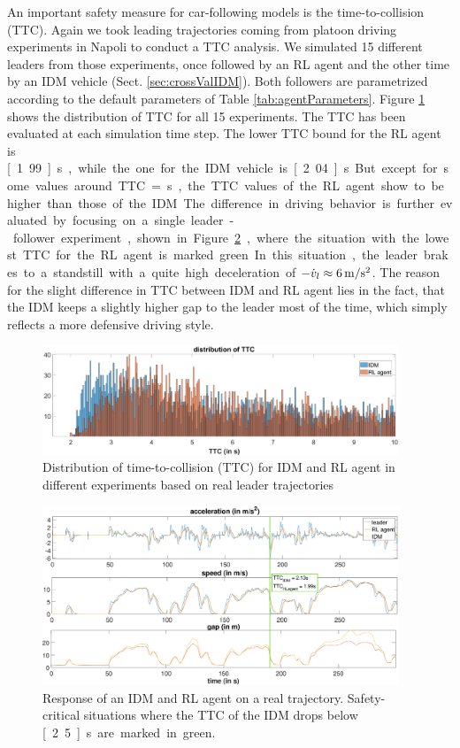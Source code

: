 \documentclass[review]{elsarticle}
\providecommand{\3}{{\ss}}
\begin{document}
	An important safety measure for car-following models is the
	time-to-collision (TTC). Again we took leading trajectories coming
	from platoon driving experiments in Napoli to conduct a TTC
	analysis. We simulated 15 different leaders from those experiments,
	once followed by an RL agent and the other time by an IDM vehicle (Sect. \ref{sec:crossValIDM}). Both
	followers are parametrized according to the default parameters of Table
	\ref{tab:agentParameters}. Figure \ref{fig:DistributionTTC} shows the
	distribution of TTC for all 15 experiments. The TTC has been evaluated
	at each simulation time step. The lower TTC bound for the RL agent is
	\unit[1.99]{s}, while the one for the IDM vehicle is
	\unit[2.04]{s}. But except for some values around TTC = \unit[2]{s}, the TTC values of the RL agent show to be higher than those of the IDM.
	
	The difference in driving behavior is further
	evaluated by focusing on a single leader-follower experiment, shown in
	Figure \ref{fig:TTC_CaseStudy}, where the situation with the lowest TTC for the RL agent is marked green. In this situation, the leader brakes to a standstill with a 
	quite high deceleration of $-\dot{v}_l \approx \unit[6]{m/s^2}$. The reason for the slight
	difference in TTC between IDM and RL agent lies in the fact, that the
	IDM keeps a slightly higher gap to the leader most of the time,
	which simply reflects a more defensive driving style. 
	
	\begin{figure}	
		\centering
		\includegraphics[width=0.95\textwidth]{images/TTC}
		\caption{Distribution of time-to-collision (TTC) for IDM and RL agent in different experiments based on real leader trajectories}
		\label{fig:DistributionTTC}
	\end{figure}
	
	\begin{figure}	
		\centering
		\includegraphics[width=0.95\textwidth]{images/TTC_CaseStudy}
		\caption{Response of an IDM and RL agent on a real trajectory. Safety-critical situations where the TTC of the IDM drops below \unit[2.5]{s} are marked in green.}
		\label{fig:TTC_CaseStudy}
	\end{figure}
	
\end{document}
